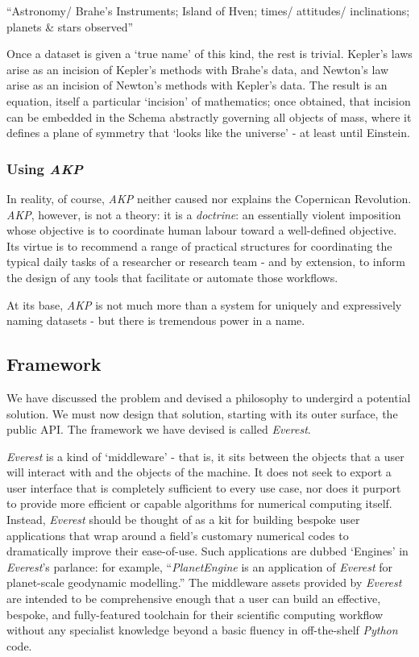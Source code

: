 \documentclass[a4paper,11pt,oneside]{book}
\begin{document}
``Astronomy/ Brahe's Instruments; Island of Hven; times/ attitudes/ inclinations; planets \& stars observed''

Once a dataset is given a `true name' of this kind, the rest is trivial. Kepler's laws arise as an incision of Kepler's methods with Brahe's data, and Newton's law arise as an incision of Newton's methods with Kepler's data. The result is an equation, itself a particular `incision' of mathematics; once obtained, that incision can be embedded in the Schema abstractly governing all objects of mass, where it defines a plane of symmetry that `looks like the universe' - at least until Einstein.

\subsubsection{Using \textit{AKP}}

In reality, of course, \textit{AKP} neither caused nor explains the Copernican Revolution. \textit{AKP}, however, is not a theory: it is a \textit{doctrine}: an essentially violent imposition whose objective is to coordinate human labour toward a well-defined objective. Its virtue is to recommend a range of practical structures for coordinating the typical daily tasks of a researcher or research team - and by extension, to inform the design of any tools that facilitate or automate those workflows.

At its base, \textit{AKP} is not much more than a system for uniquely and expressively naming datasets - but there is tremendous power in a name.

\subsection{Framework}

We have discussed the problem and devised a philosophy to undergird a potential solution. We must now design that solution, starting with its outer surface, the public API. The framework we have devised is called \textit{Everest}.

\textit{Everest} is a kind of `middleware' - that is, it sits between the objects that a user will interact with and the objects of the machine. It does not seek to export a user interface that is completely sufficient to every use case, nor does it purport to provide more efficient or capable algorithms for numerical computing itself. Instead, \textit{Everest} should be thought of as a kit for building bespoke user applications that wrap around a field's customary numerical codes to dramatically improve their ease-of-use. Such applications are dubbed `Engines' in \textit{Everest}'s parlance: for example, ``\textit{PlanetEngine} is an application of \textit{Everest} for planet-scale geodynamic modelling.'' The middleware assets provided by \textit{Everest} are intended to be comprehensive enough that a user can build an effective, bespoke, and fully-featured toolchain for their scientific computing workflow without any specialist knowledge beyond a basic fluency in off-the-shelf \textit{Python} code.
\end{document}
